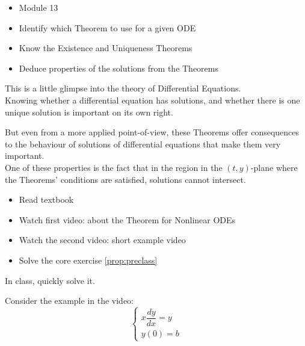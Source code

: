 \begin{lesson}

	\begin{itemize}
		\item Module 13
	\end{itemize}

	\begin{itemize}
		\item Identify which Theorem to use for a given ODE
		\item Know the Existence and Uniqueness Theorems
		\item Deduce properties of the solutions from the Theorems
	\end{itemize}
	

This is a little glimpse into the theory of Differential Equations. \\

Knowing whether a differential equation has solutions, and whether there is one unique solution is important on its own right.

But even from a more applied point-of-view, these Theorems offer consequences to the behaviour of solutions of differential equations that make them very important. \\

One of these properties is the fact that in the region in the $(t,y)$-plane where the Theorems' conditions are satisfied, solutions cannot intersect.


\begin{itemize}
	\item Read textbook
	\item Watch first video: about the Theorem for Nonlinear ODEs
	\item Watch the second video: short example video
	\item Solve the core exercise \ref{prop:preclass}
\end{itemize}


\end{lesson}






\begin{annotation}
\begin{goals}
	In class, quickly solve it.
\end{goals}	
\end{annotation}
\question \label{prop:preclass}Consider the example in the video:
$$
\begin{cases}
x \dfrac{dy}{dx} = y \\
y(0)=b
\end{cases}
$$

